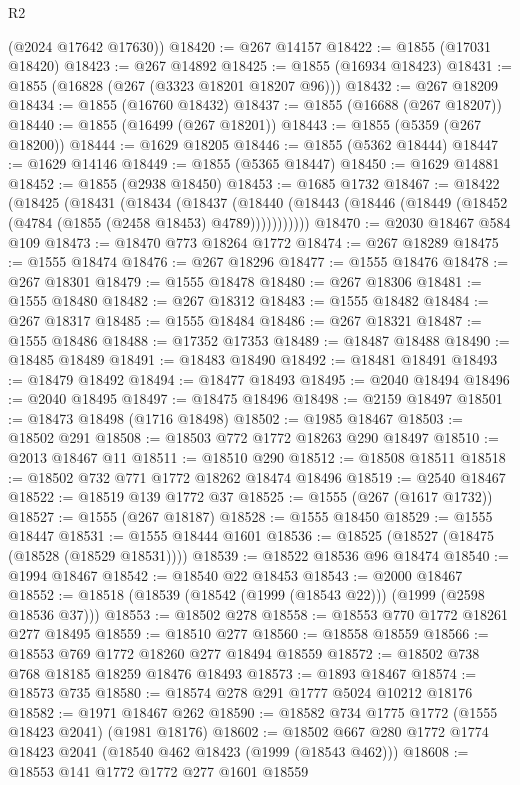\begin{lexlean}{R2}
\begin{coremodule}
      (@2024 @17642 @17630))
@18420 := @267 @14157
@18422 := @1855 (@17031 @18420)
@18423 := @267 @14892
@18425 := @1855 (@16934 @18423)
@18431 := @1855 (@16828 (@267 (@3323 @18201 @18207 @96)))
@18432 := @267 @18209
@18434 := @1855 (@16760 @18432)
@18437 := @1855 (@16688 (@267 @18207))
@18440 := @1855 (@16499 (@267 @18201))
@18443 := @1855 (@5359 (@267 @18200))
@18444 := @1629 @18205
@18446 := @1855 (@5362 @18444)
@18447 := @1629 @14146
@18449 := @1855 (@5365 @18447)
@18450 := @1629 @14881
@18452 := @1855 (@2938 @18450)
@18453 := @1685 @1732
@18467 := @18422
    (@18425
      (@18431
        (@18434
          (@18437
            (@18440 (@18443 (@18446 (@18449 (@18452 (@4784 (@1855 (@2458 @18453) @4789)))))))))))
@18470 := @2030 @18467 @584 @109
@18473 := @18470 @773 @18264 @1772
@18474 := @267 @18289
@18475 := @1555 @18474
@18476 := @267 @18296
@18477 := @1555 @18476
@18478 := @267 @18301
@18479 := @1555 @18478
@18480 := @267 @18306
@18481 := @1555 @18480
@18482 := @267 @18312
@18483 := @1555 @18482
@18484 := @267 @18317
@18485 := @1555 @18484
@18486 := @267 @18321
@18487 := @1555 @18486
@18488 := @17352 @17353
@18489 := @18487 @18488
@18490 := @18485 @18489
@18491 := @18483 @18490
@18492 := @18481 @18491
@18493 := @18479 @18492
@18494 := @18477 @18493
@18495 := @2040 @18494
@18496 := @2040 @18495
@18497 := @18475 @18496
@18498 := @2159 @18497
@18501 := @18473 @18498 (@1716 @18498)
@18502 := @1985 @18467
@18503 := @18502 @291
@18508 := @18503 @772 @1772 @18263 @290 @18497
@18510 := @2013 @18467 @11
@18511 := @18510 @290
@18512 := @18508 @18511
@18518 := @18502 @732 @771 @1772 @18262 @18474 @18496
@18519 := @2540 @18467
@18522 := @18519 @139 @1772 @37
@18525 := @1555 (@267 (@1617 @1732))
@18527 := @1555 (@267 @18187)
@18528 := @1555 @18450
@18529 := @1555 @18447
@18531 := @1555 @18444 @1601
@18536 := @18525 (@18527 (@18475 (@18528 (@18529 @18531))))
@18539 := @18522 @18536 @96 @18474
@18540 := @1994 @18467
@18542 := @18540 @22 @18453
@18543 := @2000 @18467
@18552 := @18518 (@18539 (@18542 (@1999 (@18543 @22))) (@1999 (@2598 @18536 @37)))
@18553 := @18502 @278
@18558 := @18553 @770 @1772 @18261 @277 @18495
@18559 := @18510 @277
@18560 := @18558 @18559
@18566 := @18553 @769 @1772 @18260 @277 @18494 @18559
@18572 := @18502 @738 @768 @18185 @18259 @18476 @18493
@18573 := @1893 @18467
@18574 := @18573 @735
@18580 := @18574 @278 @291 @1777 @5024 @10212 @18176
@18582 := @1971 @18467 @262
@18590 := @18582 @734 @1775 @1772 (@1555 @18423 @2041) (@1981 @18176)
@18602 := @18502 @667 @280 @1772 @1774 @18423 @2041 (@18540 @462 @18423 (@1999 (@18543 @462)))
@18608 := @18553 @141 @1772 @1772 @277 @1601 @18559

\end{coremodule}
\end{lexlean}
